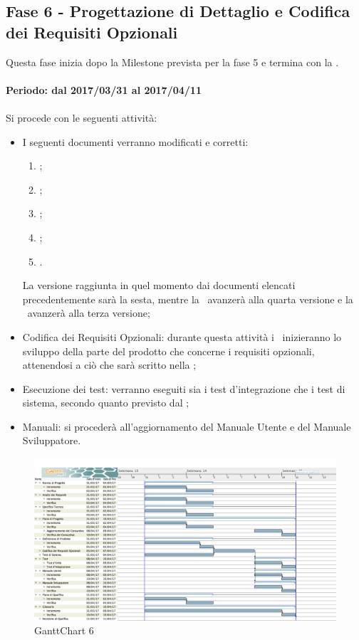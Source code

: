 \documentclass[../PianoDiProgetto.tex]{subfiles}
\begin{document}
	\subsection{Fase 6 - Progettazione di Dettaglio e Codifica dei Requisiti Opzionali}
	Questa fase inizia dopo la Milestone prevista per la fase 5 e termina con la \revisionediqualifica.
	\\
	\\
	\textbf{Periodo: dal 2017/03/31 al 2017/04/11}
	\\
	\\
	Si procede con le seguenti attività:
	\begin{itemize}
		\item I seguenti documenti verranno modificati e corretti:
			\begin{enumerate}
				\item \normediprogetto;
				\item \analisideirequisiti;
				\item \pianodiqualifica;
				\item \pianodiprogetto;
				\item \glossario.
			\end{enumerate}
		La versione raggiunta in quel momento dai documenti elencati precedentemente sarà la sesta, mentre la \specificatecnica\ avanzerà alla quarta versione e la \ avanzerà alla terza versione;
		\item Codifica dei Requisiti Opzionali: durante questa attività i \programmatori\ inizieranno lo sviluppo della parte del prodotto che concerne i requisiti opzionali, attenendosi a ciò che sarà scritto nella ;
		\item Esecuzione dei test: verranno eseguiti sia i test d'integrazione che i test di sistema, secondo quanto previsto dal \pianodiqualifica;
		\item Manuali: si procederà all'aggiornamento del Manuale Utente e del Manuale Sviluppatore.
	\end{itemize}
	
	\begin{figure}[!h]
		\centering
		\includegraphics[width=\textwidth]{Pianificazione/Immagini/GanttChart06.png}
		\caption{GanttChart 6}
	\end{figure}	
	
\end{document}

